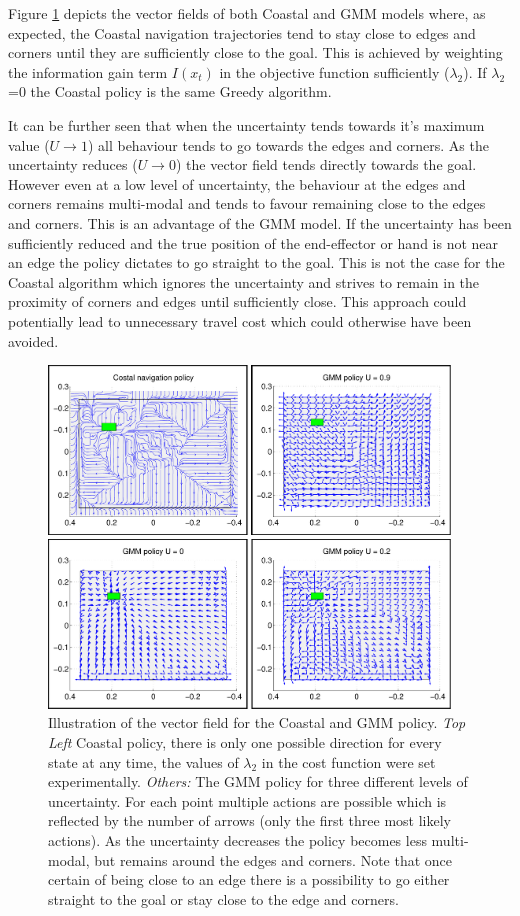Figure \ref{fig:vectorfield} depicts the vector fields of both Coastal and GMM models where, as expected, the Coastal navigation 
trajectories tend to stay close to edges and corners until they are sufficiently close to the goal. This is achieved by weighting 
the information gain term $I(x_t)$ in the objective function sufficiently ($\lambda_2$). If $\lambda_2$=0 the Coastal policy is 
the same Greedy algorithm. 

It can be further seen that when the uncertainty tends towards it's maximum value ($U \rightarrow 1$) 
all behaviour tends to go towards the edges and corners. As the uncertainty reduces ($U \rightarrow 0$) the vector field 
tends directly towards the goal. However even at a low level of uncertainty, the behaviour at the edges and corners remains 
multi-modal and tends to favour remaining close to the edges and corners. 
This is an advantage of the GMM model. If the uncertainty has been sufficiently reduced and 
the true position of the end-effector or hand is not near an 
edge the policy dictates to go straight to the goal. This is not the case for the Coastal algorithm which ignores the 
uncertainty and strives to remain in the proximity of corners and edges until sufficiently close. 
This approach could potentially lead to unnecessary travel cost which could otherwise have been avoided.

\begin{figure}
  \centering
  \includegraphics[width=0.95\textwidth]{./ch3-Search/Figures/Figure10}
  \caption{Illustration of the vector field for the Coastal and GMM policy. \textit{Top Left} Coastal policy, there is only one possible direction for every 
  state at any time, the values of $\lambda_2$ in the cost function were set experimentally. \textit{Others:} The GMM policy for three different levels of
  uncertainty. For each point multiple actions are possible which is reflected by the number of arrows (only the first three most likely actions). As 
  the uncertainty decreases the policy becomes less multi-modal, but remains around the edges and corners. Note that once certain
  of being close to an edge there is a possibility to go either straight to the goal or stay close to the edge and corners.}
  \label{fig:vectorfield}
\end{figure}

